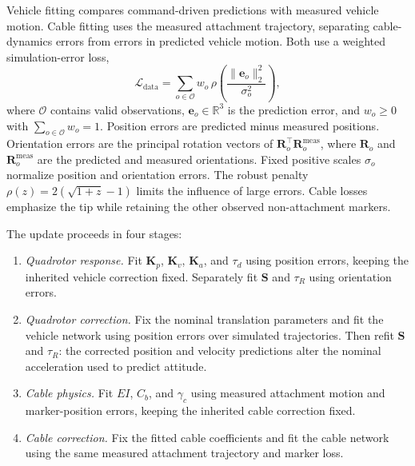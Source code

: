 \documentclass[letterpaper, 10 pt, conference]{ieeeconf}
\begin{document}
Vehicle fitting compares command-driven predictions with measured
vehicle motion. Cable fitting uses the measured attachment
trajectory, separating cable-dynamics errors from errors in
predicted vehicle motion. Both use a weighted simulation-error loss,
\begin{equation}
\mathcal L_{\mathrm{data}}
=\sum_{o\in\mathcal O}w_o\,\rho\!\left(\frac{\|\mathbf e_o\|_2^2}{\sigma_o^2}\right),
\label{eq:refinement_data_loss}
\end{equation}
where $\mathcal O$ contains valid observations,
$\mathbf e_o\in\mathbb R^3$ is the prediction error, and
$w_o\geq0$ with $\sum_{o\in\mathcal O}w_o=1$.
Position errors are predicted minus measured positions.
Orientation errors are the principal rotation vectors of
$\mathbf R_o^\top\mathbf R_o^{\mathrm{meas}}$, where
$\mathbf R_o$ and $\mathbf R_o^{\mathrm{meas}}$ are the
predicted and measured orientations.
Fixed positive scales $\sigma_o$ normalize position and
orientation errors. The robust penalty
$\rho(z)=2(\sqrt{1+z}-1)$ limits the influence of large errors.
Cable losses emphasize the tip while retaining the other observed
non-attachment markers.

The update proceeds in four stages:
\begin{enumerate}
    \item \emph{Quadrotor response.}
    Fit $\mathbf K_p$, $\mathbf K_v$, $\mathbf K_a$, and
    $\tau_d$ using position errors, keeping the inherited vehicle
    correction fixed. Separately fit $\mathbf S$ and $\tau_R$
    using orientation errors.

    \item \emph{Quadrotor correction.}
    Fix the nominal translation parameters and fit the vehicle
    network using position errors over simulated trajectories.
    Then refit $\mathbf S$ and $\tau_R$: the corrected position
    and velocity predictions alter the nominal acceleration
    used to predict attitude.

    \item \emph{Cable physics.}
    Fit $EI$, $C_b$, and $\gamma_c$ using measured attachment
    motion and marker-position errors, keeping the inherited
    cable correction fixed.

    \item \emph{Cable correction.}
    Fix the fitted cable coefficients and fit the cable network
    using the same measured attachment trajectory and marker loss.
\end{enumerate}
\end{document}
